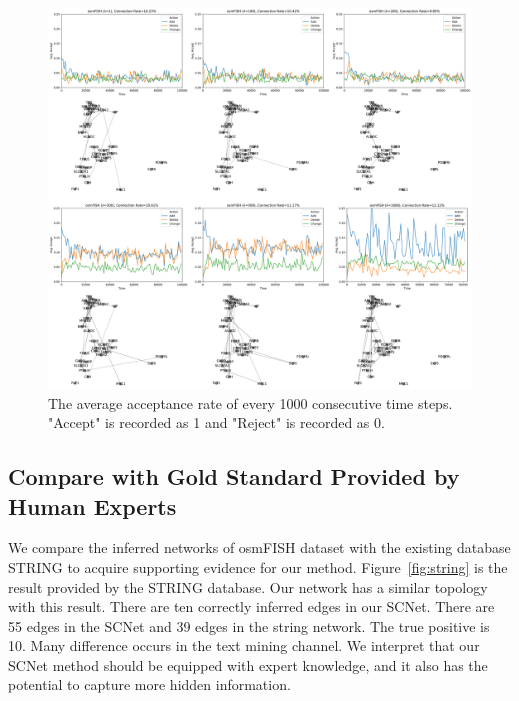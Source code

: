 \documentclass{bioinfo}
\begin{document}
\begin{figure}
\centering
  \includegraphics[width=\textwidth]{figure/convergence.png}
  \caption{The average acceptance rate of every 1000 consecutive time steps. "Accept" is recorded as 1 and "Reject" is recorded as 0.}\label{figure:convergence}
\end{figure}


\subsection{Compare with Gold Standard Provided by Human Experts}
We compare the inferred networks of osmFISH dataset with the existing database STRING to acquire supporting evidence for our method. Figure~\ref{fig:string} is the result provided by the STRING database. Our network has a similar topology with this result. There are ten correctly inferred edges in our SCNet. There are 55 edges in the SCNet and 39 edges in the string network. The true positive is 10. Many difference occurs in the text mining channel. We interpret that our SCNet method should be equipped with expert knowledge, and it also has the potential to capture more hidden information.
\end{document}
